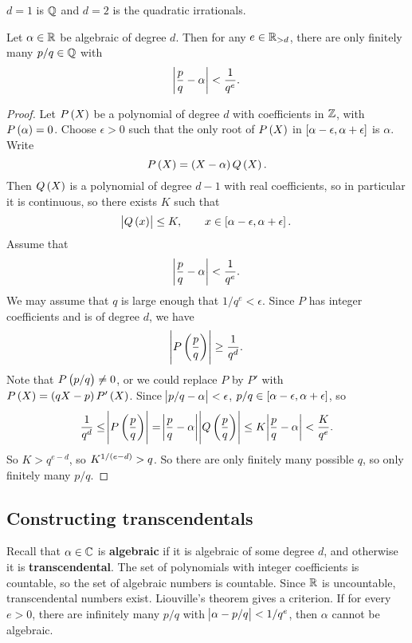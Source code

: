\begin{example*}
$ d = 1 $ is $ \mathbb{Q} $ and $ d = 2 $ is the quadratic irrationals.
\end{example*}

\begin{theorem}
Let $ \alpha \in \mathbb{R} $ be algebraic of degree $ d $. Then for any $ e \in \mathbb{R}_{> d} $, there are only finitely many $ p / q \in \mathbb{Q} $ with
$$ \abs{\dfrac{p}{q} - \alpha} < \dfrac{1}{q^e}. $$
\end{theorem}

\begin{proof}
Let $ P\br{X} $ be a polynomial of degree $ d $ with coefficients in $ \mathbb{Z} $, with $ P\br{\alpha} = 0 $. Choose $ \epsilon > 0 $ such that the only root of $ P\br{X} $ in $ \sbr{\alpha - \epsilon, \alpha + \epsilon} $ is $ \alpha $. Write
$$ P\br{X} = \br{X - \alpha}Q\br{X}. $$
Then $ Q\br{X} $ is a polynomial of degree $ d - 1 $ with real coefficients, so in particular it is continuous, so there exists $ K $ such that
$$ \abs{Q\br{x}} \le K, \qquad x \in \sbr{\alpha - \epsilon, \alpha + \epsilon}. $$
Assume that
$$ \abs{\dfrac{p}{q} - \alpha} < \dfrac{1}{q^e}. $$
We may assume that $ q $ is large enough that $ 1 / q^e < \epsilon $. Since $ P $ has integer coefficients and is of degree $ d $, we have
$$ \abs{P\br{\dfrac{p}{q}}} \ge \dfrac{1}{q^d}. $$
Note that $ P\br{p / q} \ne 0 $, or we could replace $ P $ by $ P' $ with $ P\br{X} = \br{qX - p}P'\br{X} $. Since $ \abs{p / q - \alpha} < \epsilon $, $ p / q \in \sbr{\alpha - \epsilon, \alpha + \epsilon} $, so
$$ \dfrac{1}{q^d} \le \abs{P\br{\dfrac{p}{q}}} = \abs{\dfrac{p}{q} - \alpha} \abs{Q\br{\dfrac{p}{q}}} \le K \abs{\dfrac{p}{q} - \alpha} < \dfrac{K}{q^e}. $$
So $ K > q^{e - d} $, so $ K^{1 / \br{e - d}} > q $. So there are only finitely many possible $ q $, so only finitely many $ p / q $.
\end{proof}

\subsection{Constructing transcendentals}

Recall that $ \alpha \in \mathbb{C} $ is \textbf{algebraic} if it is algebraic of some degree $ d $, and otherwise it is \textbf{transcendental}. The set of polynomials with integer coefficients is countable, so the set of algebraic numbers is countable. Since $ \mathbb{R} $ is uncountable, transcendental numbers exist. Liouville's theorem gives a criterion. If for every $ e > 0 $, there are infinitely many $ p / q $ with $ \abs{\alpha - p / q} < 1 / q^e $, then $ \alpha $ cannot be algebraic.

